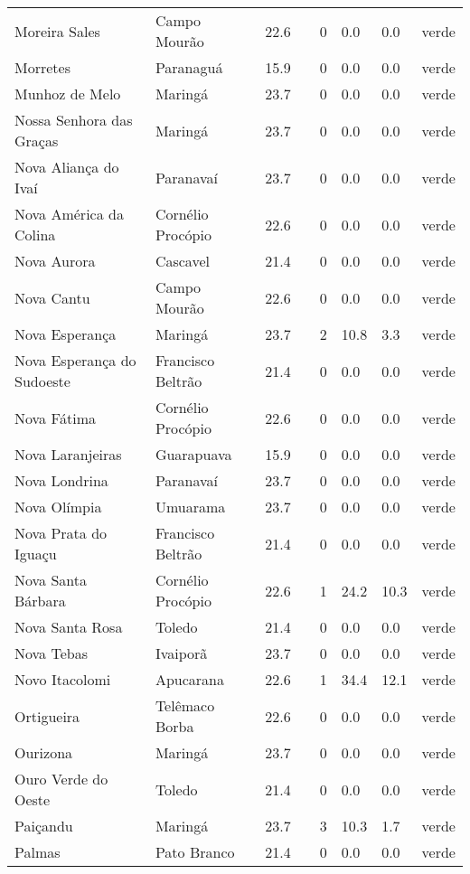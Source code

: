 \begin{longtable}{l|lllllll}
  Moreira Sales & Campo Mourão & 22.6 &  & 0 & 0.0 & 0.0 & verde \\ 
  Morretes & Paranaguá & 15.9 &  & 0 & 0.0 & 0.0 & verde \\ 
  Munhoz de Melo & Maringá & 23.7 &  & 0 & 0.0 & 0.0 & verde \\ 
  Nossa Senhora das Graças & Maringá & 23.7 &  & 0 & 0.0 & 0.0 & verde \\ 
  Nova Aliança do Ivaí & Paranavaí & 23.7 &  & 0 & 0.0 & 0.0 & verde \\ 
  Nova América da Colina & Cornélio Procópio & 22.6 &  & 0 & 0.0 & 0.0 & verde \\ 
  Nova Aurora & Cascavel & 21.4 &  & 0 & 0.0 & 0.0 & verde \\ 
  Nova Cantu & Campo Mourão & 22.6 &  & 0 & 0.0 & 0.0 & verde \\ 
  Nova Esperança & Maringá & 23.7 &  & 2 & 10.8 & 3.3 & verde \\ 
  Nova Esperança do Sudoeste & Francisco Beltrão & 21.4 &  & 0 & 0.0 & 0.0 & verde \\ 
  Nova Fátima & Cornélio Procópio & 22.6 &  & 0 & 0.0 & 0.0 & verde \\ 
  Nova Laranjeiras & Guarapuava & 15.9 &  & 0 & 0.0 & 0.0 & verde \\ 
  Nova Londrina & Paranavaí & 23.7 &  & 0 & 0.0 & 0.0 & verde \\ 
  Nova Olímpia & Umuarama & 23.7 &  & 0 & 0.0 & 0.0 & verde \\ 
  Nova Prata do Iguaçu & Francisco Beltrão & 21.4 &  & 0 & 0.0 & 0.0 & verde \\ 
  Nova Santa Bárbara & Cornélio Procópio & 22.6 &  & 1 & 24.2 & 10.3 & verde \\ 
  Nova Santa Rosa & Toledo & 21.4 &  & 0 & 0.0 & 0.0 & verde \\ 
  Nova Tebas & Ivaiporã & 23.7 &  & 0 & 0.0 & 0.0 & verde \\ 
  Novo Itacolomi & Apucarana & 22.6 &  & 1 & 34.4 & 12.1 & verde \\ 
  Ortigueira & Telêmaco Borba & 22.6 &  & 0 & 0.0 & 0.0 & verde \\ 
  Ourizona & Maringá & 23.7 &  & 0 & 0.0 & 0.0 & verde \\ 
  Ouro Verde do Oeste & Toledo & 21.4 &  & 0 & 0.0 & 0.0 & verde \\ 
  Paiçandu & Maringá & 23.7 &  & 3 & 10.3 & 1.7 & verde \\ 
  Palmas & Pato Branco & 21.4 &  & 0 & 0.0 & 0.0 & verde \\ 

\end{longtable}
